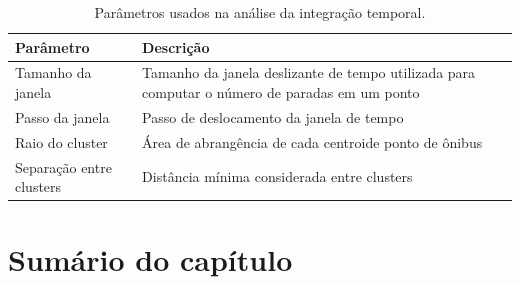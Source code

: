 
\begin{table}[htb]
    \caption{Parâmetros usados na análise da integração temporal.}
    \centering
    \begin{tabular}{ p{5cm}p{9cm}} 
        \hline
        Parâmetro & Descrição\\
        \hline
        Tamanho da janela & Tamanho da janela deslizante de tempo utilizada para computar o número de paradas em um ponto \\
        Passo da janela & Passo de deslocamento da janela de tempo \\
        Raio do cluster & Área de abrangência de cada centroide ponto de ônibus  \\
        Separação entre clusters  & Distância mínima considerada entre clusters \\
        \hline  
    \end{tabular}
    \label{tab:par}
\end{table}

\section{Sumário do capítulo}

